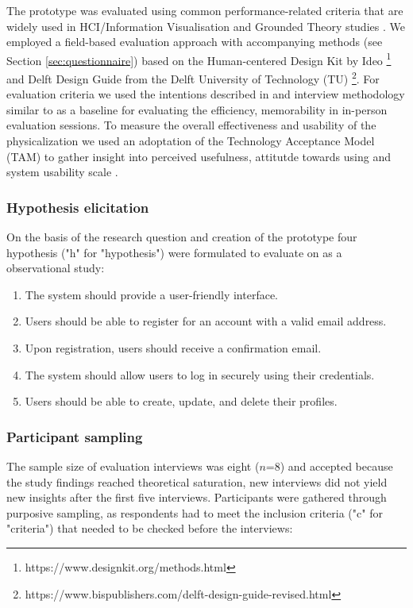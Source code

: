 The prototype was evaluated using common performance-related criteria that are widely used in HCI/Information Visualisation \cite{ranasinghe_encoding_2023} and Grounded Theory studies \cite{chun_tie_grounded_2019}. We employed a field-based evaluation approach with accompanying methods (see Section \ref{sec:questionnaire}) based on the Human-centered Design Kit by Ideo \footnote{https://www.designkit.org/methods.html} and Delft Design Guide from the Delft University of Technology (TU) \footnote{https://www.bispublishers.com/delft-design-guide-revised.html}. For evaluation criteria we used the intentions described in \cite{ranasinghe_encoding_2023} and interview methodology similar to \cite{jansen_evaluating_2013} as a baseline for evaluating the efficiency, memorability in in-person evaluation sessions. To measure the overall effectiveness and usability of the physicalization we used an adoptation of the Technology Acceptance Model (TAM) to gather insight into perceived usefulness, attitutde towards using and system usability scale \cite{}. 

\subsubsection{Hypothesis elicitation}

On the basis of the research question and creation of the prototype four hypothesis ("h" for "hypothesis") were formulated to evaluate on as a observational study:

\begin{enumerate}
    \renewcommand{\labelenumi}{H\arabic{enumi}:}
    \item The system should provide a user-friendly interface.
    \item Users should be able to register for an account with a valid email address.
    \item Upon registration, users should receive a confirmation email.
    \item The system should allow users to log in securely using their credentials.
    \item Users should be able to create, update, and delete their profiles.
\end{enumerate}

\subsubsection{Participant sampling}

The sample size of evaluation interviews was eight ($n$=8) and accepted because the study findings reached theoretical saturation, new interviews did not yield new insights after the first five interviews. Participants were gathered through purposive sampling, as respondents had to meet the inclusion criteria ("c" for "criteria") that needed to be checked before the interviews: 

